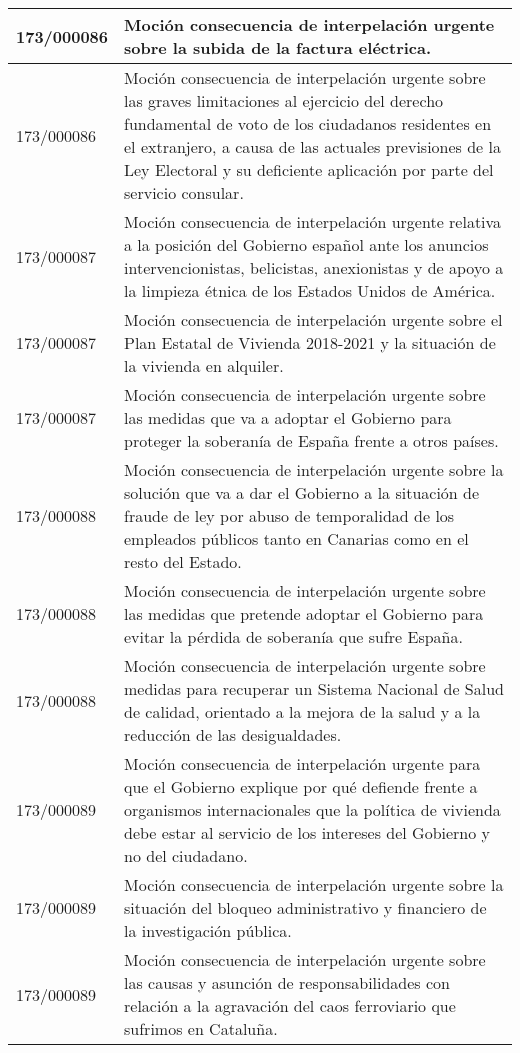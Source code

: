 {\begin{table}[H]
\begin{center}
\begin{tabularx}{\linewidth}{| l | X |}
\hline
173/000086 & Moción consecuencia de interpelación urgente sobre la subida de la factura eléctrica. \\
\hline
173/000086 & Moción consecuencia de interpelación urgente sobre las graves limitaciones al ejercicio del derecho fundamental de voto de los ciudadanos residentes en el extranjero, a causa de las actuales previsiones de la Ley Electoral y su deficiente aplicación por parte del servicio consular. \\
\hline
173/000087 & Moción consecuencia de interpelación urgente relativa a la posición del Gobierno español ante los anuncios intervencionistas, belicistas, anexionistas y de apoyo a la limpieza étnica de los Estados Unidos de América. \\
\hline
173/000087 & Moción consecuencia de interpelación urgente sobre el Plan Estatal de Vivienda 2018-2021 y la situación de la vivienda en alquiler. \\
\hline
173/000087 & Moción consecuencia de interpelación urgente sobre las medidas que va a adoptar el Gobierno para proteger la soberanía de España frente a otros países. \\
\hline
173/000088 & Moción consecuencia de interpelación urgente sobre la solución que va a dar el Gobierno a la situación de fraude de ley por abuso de temporalidad de los empleados públicos tanto en Canarias como en el resto del Estado. \\
\hline
173/000088 & Moción consecuencia de interpelación urgente sobre las medidas que pretende adoptar el Gobierno para evitar la pérdida de soberanía que sufre España. \\
\hline
173/000088 & Moción consecuencia de interpelación urgente sobre medidas para recuperar un Sistema Nacional de Salud de calidad, orientado a la mejora de la salud y a la reducción de las desigualdades. \\
\hline
173/000089 & Moción consecuencia de interpelación urgente para que el Gobierno explique por qué defiende frente a organismos internacionales que la política de vivienda debe estar al servicio de los intereses del Gobierno y no del ciudadano. \\
\hline
173/000089 & Moción consecuencia de interpelación urgente sobre la situación del bloqueo administrativo y financiero de la investigación pública. \\
\hline
173/000089 & Moción consecuencia de interpelación urgente sobre las causas y asunción de responsabilidades con relación a la agravación del caos ferroviario que sufrimos en Cataluña. \\

\end{tabularx}
\end{center}
\end{table}}
